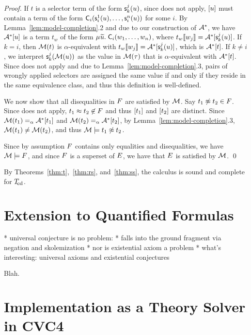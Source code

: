 \begin{proof}
If $t$ is a selector term of the form $\textsf{s}^j_k( u )$,
since  does not apply,
$[u]$ must contain a term of the form $\textsf{C}_i( \textsf{s}^1_i( u ), \ldots, \textsf{s}^{n}_i( u ) )$ for some $i$.
By Lemma~\ref{lem:model-completion}.2 and due to our construction of $\mathcal{A}^\ast$, we have $\mathcal{A}^\ast [u]$ is a term $t_w$ of the form
$\MU {\Varec{u}}.\; \const C_i( w_1, \ldots, w_n )$,
where $t_w \llbracket  w_j  \rrbracket = \mathcal{A}^\ast [ \textsf{s}^j_k( u )]$. 
If $k = i$, then $\mathcal{M}( t )$ is $\alpha$-equivalent with $t_w\llbracket w_j \rrbracket = \mathcal{A}^\ast [ \textsf{s}^j_k( u )]$,
which is $\mathcal{A}^\ast [t]$.
If $k \neq i$, we interpret $\textsf{s}^j_k( \mathcal{M}( u ) )$ as the value in $\mathcal{M}( \tau )$ that is $\alpha$-equivalent with $\mathcal{A}^\ast [ t ]$.
Since  does not apply and due to Lemma~\ref{lem:model-completion}.3,
pairs of wrongly applied selectors are assigned the same value if and only if they reside in the same equivalence class,
and thus this definition is well-defined.

We now show that all disequalities in $F$ are satisfied by $\mathcal{M}$.
Say $t_1 \not\approx t_2 \in F$.
Since  does not apply, $t_1 \approx t_2 \not\in F$ and thus $[t_1]$ and $[t_2]$ are distinct.
Since $\mathcal{M}( t_1 ) \mathrel{=_\alpha} \mathcal{A}^\ast [t_1]$ and $\mathcal{M}( t_2 ) \mathrel{=_\alpha} \mathcal{A}^\ast [t_2]$,
by Lemma~\ref{lem:model-completion}.3, $\mathcal{M}( t_1 ) \neq \mathcal{M}( t_2 )$, and thus $\mathcal{M} \models t_1 \not\approx t_2$.

Since by assumption $F$ contains only equalities and disequalities, we have $\mathcal{M} \models F$,
and since $F$ is a superset of $E$, we have that $E$ is satisfied by $\mathcal{M}$.
\qed
\end{proof}

By Theorems~\ref{thm:t},~\ref{thm:rs}, and~\ref{thm:ss}, the calculus is sound and complete for $T_{\!\mathrm{cd}}$.

\section{Extension to Quantified Formulas}
\label{sec:extension-to-quantified-formulas}

  * universal conjecture is no problem:
    * falls into the ground fragment via negation
      and skolemization
  * nor is existential axiom a problem
  * what's interesting: universal axioms and existential conjectures

Blah.

\section{Implementation as a Theory Solver in CVC4}
\label{sec:the-theory-solver}

